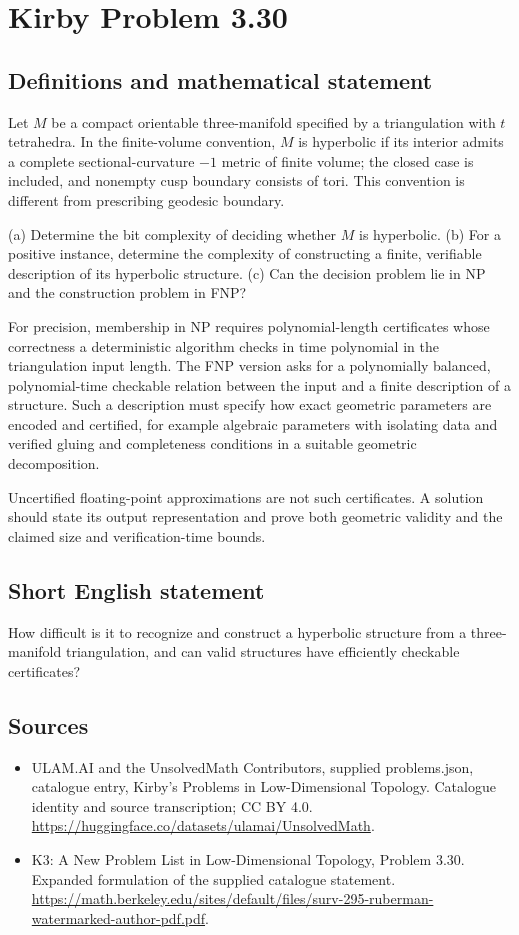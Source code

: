 \documentclass[11pt,a4paper]{article}
\begin{document}
\section*{Kirby Problem 3.30}\label{statement}

\subsection{Definitions and mathematical statement}
Let $M$ be a compact orientable three-manifold specified by a triangulation
with $t$ tetrahedra. In the finite-volume convention, $M$ is hyperbolic if
its interior admits a complete sectional-curvature $-1$ metric of finite
volume; the closed case is included, and nonempty cusp boundary consists
of tori. This convention is different from prescribing geodesic boundary.

(a) Determine the bit complexity of deciding whether $M$ is hyperbolic.
(b) For a positive instance, determine the complexity of constructing a
finite, verifiable description of its hyperbolic structure.
(c) Can the decision problem lie in NP and the construction problem in FNP?

For precision, membership in NP requires polynomial-length certificates
whose correctness a deterministic algorithm checks in time polynomial in
the triangulation input length. The FNP version asks for a polynomially
balanced, polynomial-time checkable relation between the input and a finite
description of a structure. Such a description must specify how exact
geometric parameters are encoded and certified, for example algebraic
parameters with isolating data and verified gluing and completeness
conditions in a suitable geometric decomposition.

Uncertified floating-point approximations are not such certificates. A
solution should state its output representation and prove both geometric
validity and the claimed size and verification-time bounds.
\subsection{Short English statement}
How difficult is it to recognize and construct a hyperbolic structure from a three-manifold triangulation, and can valid structures have efficiently checkable certificates?
\subsection{Sources}
\begin{itemize}
\item[S1] ULAM.AI and the UnsolvedMath Contributors, supplied problems.json, catalogue entry, Kirby's Problems in Low-Dimensional Topology. Catalogue identity and source transcription; CC BY 4.0.
\url{https://huggingface.co/datasets/ulamai/UnsolvedMath}.
\item[S2] K3: A New Problem List in Low-Dimensional Topology, Problem 3.30. Expanded formulation of the supplied catalogue statement.
\url{https://math.berkeley.edu/sites/default/files/surv-295-ruberman-watermarked-author-pdf.pdf}.
\end{itemize}
\end{document}
